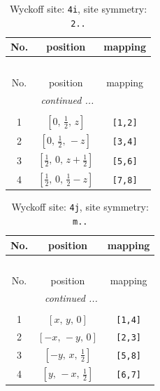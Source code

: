 \documentclass[fleqn,8pt]{jsarticle}
\begin{document}
\renewcommand{\arraystretch}{1.2}
\begin{longtable}{ccc}
\caption{Wyckoff site: {\tt 4i}, site symmetry: {\tt 2..}}
 \\
 \hline \hline
No. & position & mapping \\ \hline \endfirsthead

\multicolumn{2}{l}{\tablename\ \thetable{}} \\
 \hline \hline
No. & position & mapping \\ \hline \endhead

 \hline \hline
\multicolumn{2}{r}{\footnotesize\it continued ...} \\ \endfoot

 \hline \hline
\multicolumn{2}{r}{} \\ \endlastfoot

1 & $\left[ 0,\, \frac{1}{2},\, z \right]$ & {\tt [1,2]} \\ \hline
2 & $\left[ 0,\, \frac{1}{2},\, - z \right]$ & {\tt [3,4]} \\ \hline
3 & $\left[ \frac{1}{2},\, 0,\, z + \frac{1}{2} \right]$ & {\tt [5,6]} \\ \hline
4 & $\left[ \frac{1}{2},\, 0,\, \frac{1}{2} - z \right]$ & {\tt [7,8]} \\
\end{longtable}
\renewcommand{\arraystretch}{1.2}
\begin{longtable}{ccc}
\caption{Wyckoff site: {\tt 4j}, site symmetry: {\tt m..}}
 \\
 \hline \hline
No. & position & mapping \\ \hline \endfirsthead

\multicolumn{2}{l}{\tablename\ \thetable{}} \\
 \hline \hline
No. & position & mapping \\ \hline \endhead

 \hline \hline
\multicolumn{2}{r}{\footnotesize\it continued ...} \\ \endfoot

 \hline \hline
\multicolumn{2}{r}{} \\ \endlastfoot

1 & $\left[ x,\, y,\, 0 \right]$ & {\tt [1,4]} \\ \hline
2 & $\left[ - x,\, - y,\, 0 \right]$ & {\tt [2,3]} \\ \hline
3 & $\left[ - y,\, x,\, \frac{1}{2} \right]$ & {\tt [5,8]} \\ \hline
4 & $\left[ y,\, - x,\, \frac{1}{2} \right]$ & {\tt [6,7]} \\
\end{longtable}
\end{document}
